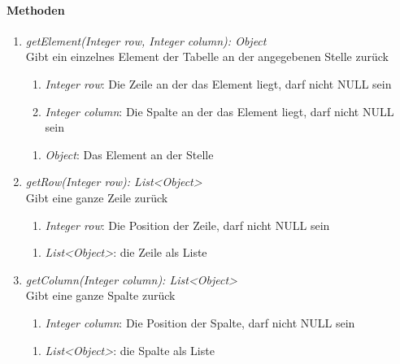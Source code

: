 		
\paragraph{Methoden}

\begin{enumerate}[+]
	\item \textit{getElement(Integer row, Integer column): Object} \\
	Gibt ein einzelnes Element der Tabelle an der angegebenen Stelle zurück
	\begin{enumerate}[$\bullet$]
		\item \textit{Integer row}: Die Zeile an der das Element liegt, darf nicht NULL sein
		\item \textit{Integer column}: Die Spalte an der das Element liegt, darf nicht NULL sein
	\end{enumerate}
	\vspace{-0.2cm}
	\begin{enumerate}[$\circ$]
		\item \textit{Object}: Das Element an der Stelle
	\end{enumerate}
	
	\item \textit{getRow(Integer row): List<Object>} \\
	Gibt eine ganze Zeile zurück
	\begin{enumerate}[$\bullet$]
		\item \textit{Integer row}: Die Position der Zeile, darf nicht NULL sein
	\end{enumerate}
	\vspace{-0.2cm}
	\begin{enumerate}[$\circ$]
		\item \textit{List<Object>}: die Zeile als Liste
	\end{enumerate}
	
	\item \textit{getColumn(Integer column): List<Object>} \\
	Gibt eine ganze Spalte zurück
	\begin{enumerate}[$\bullet$]
		\item \textit{Integer column}: Die Position der Spalte, darf nicht NULL sein
	\end{enumerate}
	\vspace{-0.2cm}
	\begin{enumerate}[$\circ$]
		\item \textit{List<Object>}: die Spalte als Liste
	\end{enumerate}
	

\end{enumerate}
